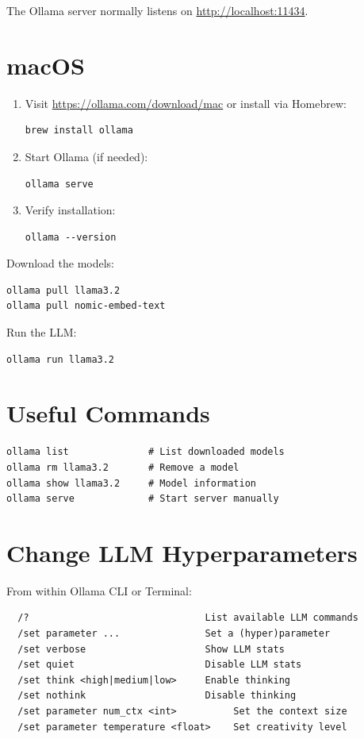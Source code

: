 \documentclass{article}
\begin{document}
\noindent The Ollama server normally listens on \url{http://localhost:11434}.

\section*{macOS}
\begin{enumerate}
    \item Visit \url{https://ollama.com/download/mac} or install via Homebrew:
    \begin{verbatim}
brew install ollama
    \end{verbatim}
    \item Start Ollama (if needed):
    \begin{verbatim}
ollama serve
    \end{verbatim}
    \item Verify installation:
    \begin{verbatim}
ollama --version
    \end{verbatim}
\end{enumerate}

Download the models:
\begin{verbatim}
ollama pull llama3.2
ollama pull nomic-embed-text
\end{verbatim}

Run the LLM:
\begin{verbatim}
ollama run llama3.2
\end{verbatim}

\section*{Useful Commands}
\begin{verbatim}
ollama list              # List downloaded models
ollama rm llama3.2       # Remove a model
ollama show llama3.2     # Model information
ollama serve             # Start server manually
\end{verbatim}

\section*{Change LLM Hyperparameters}
From within Ollama CLI or Terminal:
\begin{verbatim}
  /?                               List available LLM commands
  /set parameter ...               Set a (hyper)parameter
  /set verbose                     Show LLM stats
  /set quiet                       Disable LLM stats
  /set think <high|medium|low>     Enable thinking
  /set nothink                     Disable thinking
  /set parameter num_ctx <int>          Set the context size
  /set parameter temperature <float>    Set creativity level
\end{verbatim}
\end{document}

